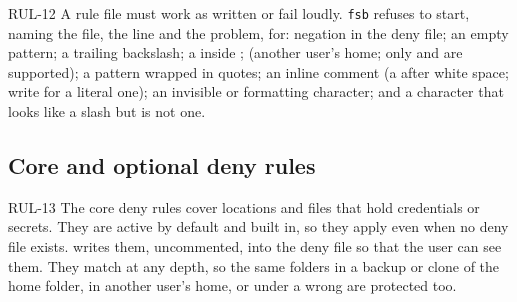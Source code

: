 \begin{req}{RUL-12}
A rule file must work as written or fail loudly.  \texttt{fsb} refuses to start,
naming the file, the line and the problem, for: negation in the deny file; an
empty pattern; a trailing backslash; a \code{/} inside \code{[...]}; 
(another user's home; only \code{\~{}} and  are supported); a
pattern wrapped in quotes; an inline comment (a \code{\#} after white space; write
\code{\textbackslash\#} for a literal one); an invisible or formatting character; and a
character that looks like a slash but is not one.
\end{req}

\subsection{Core and optional deny rules}
\label{sec:core}

\begin{req}{RUL-13}
The core deny rules cover locations and files that hold credentials or secrets.  They
are active by default and built in, so they apply even when no deny file exists.
 writes them, uncommented, into the deny file so that the user can
see them.  They match at any depth, so the same folders in a backup or clone of the
home folder, in another user's home, or under a wrong  are protected too.
\end{req}

